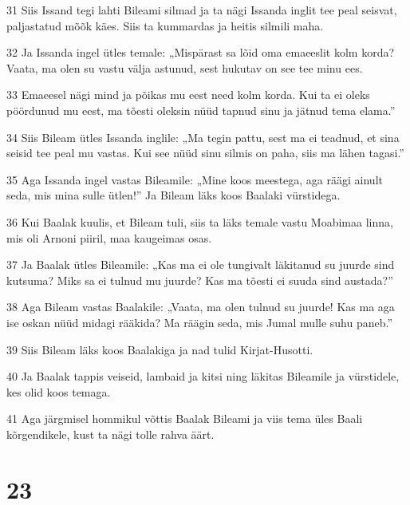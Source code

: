 \par 31 Siis Issand tegi lahti Bileami silmad ja ta nägi Issanda inglit tee peal seisvat, paljastatud mõõk käes. Siis ta kummardas ja heitis silmili maha.
\par 32 Ja Issanda ingel ütles temale: „Mispärast sa lõid oma emaeeslit kolm korda? Vaata, ma olen su vastu välja astunud, sest hukutav on see tee minu ees.
\par 33 Emaeesel nägi mind ja põikas mu eest need kolm korda. Kui ta ei oleks pöördunud mu eest, ma tõesti oleksin nüüd tapnud sinu ja jätnud tema elama.”
\par 34 Siis Bileam ütles Issanda inglile: „Ma tegin pattu, sest ma ei teadnud, et sina seisid tee peal mu vastas. Kui see nüüd sinu silmis on paha, siis ma lähen tagasi.”
\par 35 Aga Issanda ingel vastas Bileamile: „Mine koos meestega, aga räägi ainult seda, mis mina sulle ütlen!” Ja Bileam läks koos Baalaki vürstidega.
\par 36 Kui Baalak kuulis, et Bileam tuli, siis ta läks temale vastu Moabimaa linna, mis oli Arnoni piiril, maa kaugeimas osas.
\par 37 Ja Baalak ütles Bileamile: „Kas ma ei ole tungivalt läkitanud su juurde sind kutsuma? Miks sa ei tulnud mu juurde? Kas ma tõesti ei suuda sind austada?”
\par 38 Aga Bileam vastas Baalakile: „Vaata, ma olen tulnud su juurde! Kas ma aga ise oskan nüüd midagi rääkida? Ma räägin seda, mis Jumal mulle suhu paneb.”
\par 39 Siis Bileam läks koos Baalakiga ja nad tulid Kirjat-Husotti.
\par 40 Ja Baalak tappis veiseid, lambaid ja kitsi ning läkitas Bileamile ja vürstidele, kes olid koos temaga.
\par 41 Aga järgmisel hommikul võttis Baalak Bileami ja viis tema üles Baali kõrgendikele, kust ta nägi tolle rahva äärt.

\chapter{23}

